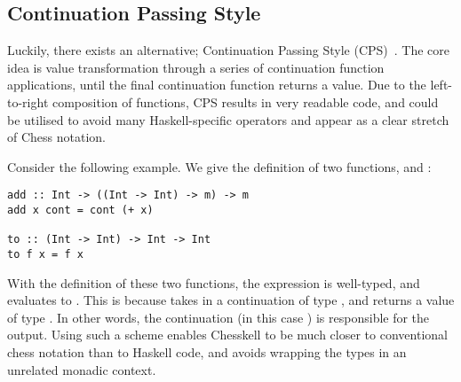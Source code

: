 \subsection{Continuation Passing Style} \label{cpsshortexample}

Luckily, there exists an alternative; Continuation Passing Style (CPS)~\cite{cps}. The core idea is value transformation through a series of continuation function applications, until the final continuation function returns a value. Due to the left-to-right composition of functions, CPS results in very readable code, and could be utilised to avoid many Haskell-specific operators and appear as a clear stretch of Chess notation.

Consider the following example. We give the definition of two functions,  and :

\begin{lstlisting}
add :: Int -> ((Int -> Int) -> m) -> m
add x cont = cont (+ x)

to :: (Int -> Int) -> Int -> Int
to f x = f x
\end{lstlisting}

With the definition of these two functions, the expression  is well-typed, and evaluates to . This is because  takes in a continuation of type , and returns a value of type . In other words, the continuation (in this case ) is responsible for the output. Using such a scheme enables Chesskell to be much closer to conventional chess notation than to Haskell code, and avoids wrapping the types in an unrelated monadic context.